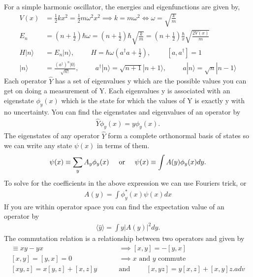 For a simple harmonic oscillator, the energies and eigenfunctions are given by,
\begin{align}
	V(x)&=\frac{1}{2}kx^2=\frac{1}{2}m\omega^2x^2\implies k=m\omega^2 \Longleftrightarrow \omega=\sqrt{\frac{k}{m}} \\
	E_n&=\left(n+\frac{1}{2}\right)\hbar\omega=\left(n+\frac{1}{2}\right)\hbar\sqrt{\frac{k}{m}}=\left(n+\frac{1}{2}\right)\frac{\hbar}{x}\sqrt{\frac{2V(x)}{m}} \\
	H | n \rangle &= E_n |n \rangle, \hspace{1cm} H = \hbar \omega \left(a^\dagger a + \frac{1}{2}\right), \hspace{1cm}[a,a^\dagger]=1 \\	
	|n\rangle &= \frac{(a^\dagger)^n|0\rangle}{\sqrt{n!}}, \hspace{1cm} a^\dagger|n\rangle = \sqrt{n+1}|n+1\rangle, \hspace{1cm}a|n \rangle = \sqrt{n}|n-1\rangle
\end{align}
Each operator $\hat{Y}$ has a set of eigenvalues y which are the possible values you can get on doing a measurement of Y. Each eigenvalues y is associated with an eigenstate $\phi_y(x)$ which is the state for which the values of Y is exactly y with no uncertainty. You can find the eigenstates and eigenvalues of an operator by 
\begin{align}
	\hat{Y}\phi_y(x) = y \phi_y(x).
\end{align}
The eigenstates of any operator $\hat{Y}$ form a complete orthonormal basis of states so we can write any state $\psi(x)$ in terms of them.
\begin{align}
	\psi(x) \equiv \sum_{y}A_y\phi_y(x) \hspace{0.5cm}\textrm{or}\hspace{0.5cm} \psi(x) \equiv \int A(y)\phi_y(x)dy.
\end{align}
To solve for the coefficients in the above expression we can use Fouriers trick, or
\begin{align}
	A(y) = \int \phi_y^*(x)\psi(x)dx 	
\end{align}
If you are within operator space you can find the expectation value of an operator by
\begin{align}
	\langle \hat{y} \rangle = \int y |A(y)|^2 dy.
\end{align}
The commutation relation is a relationship between two operators and given by
\begin{align}
	[x,y] \equiv xy-yx &\implies [x,y] = -[y,x] \\
	[x,y]=[y,x]=0 &\implies \textrm{$x$ and $y$ commute} \\
	[xy,z] = x[y,z]+[x,z]y \hspace{1cm} &\textrm{and} \hspace{1cm}[x,yz] = y[x,z]+[x,y]z.adv
\end{align} 
